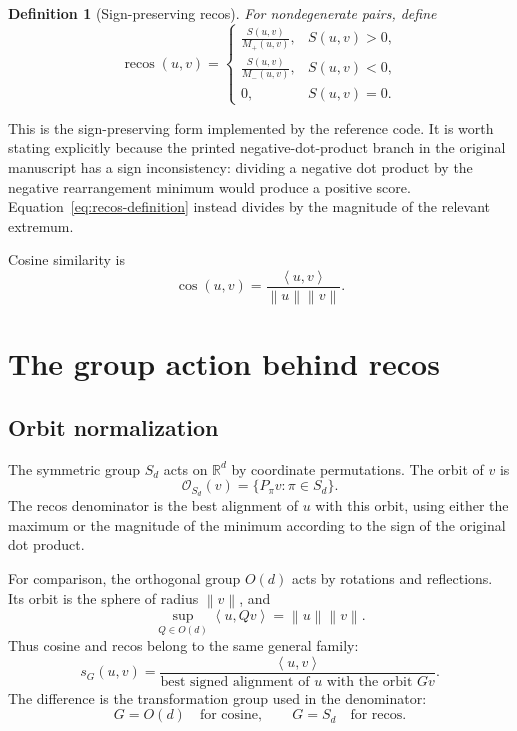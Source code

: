 \documentclass[11pt,a4paper]{article}
\newtheorem{definition}{Definition}
\newcommand{\R}{\mathbb{R}}
\newcommand{\Sd}{S_d}
\newcommand{\Od}{O(d)}
\newcommand{\ip}[2]{\left\langle #1,#2\right\rangle}
\newcommand{\norm}[1]{\left\lVert #1\right\rVert}
\newcommand{\recos}{\operatorname{recos}}
\newcommand{\cosim}{\operatorname{cos}}
\begin{document}
\begin{definition}[Sign-preserving recos]
For nondegenerate pairs, define
\begin{equation}
\recos(u,v)=
\begin{cases}
\displaystyle \frac{S(u,v)}{M_+(u,v)}, & S(u,v)>0,\\[1.0em]
\displaystyle \frac{S(u,v)}{M_-(u,v)}, & S(u,v)<0,\\[0.6em]
0, & S(u,v)=0.
\end{cases}
\label{eq:recos-definition}
\end{equation}
\end{definition}

This is the sign-preserving form implemented by the reference code. It is worth stating explicitly because the printed negative-dot-product branch in the original manuscript has a sign inconsistency: dividing a negative dot product by the negative rearrangement minimum would produce a positive score. Equation~\eqref{eq:recos-definition} instead divides by the magnitude of the relevant extremum.

Cosine similarity is
\begin{equation}
    \cosim(u,v)=\frac{\ip{u}{v}}{\norm{u}\norm{v}}.
\end{equation}

\section{The group action behind recos}

\subsection{Orbit normalization}

The symmetric group $\Sd$ acts on $\R^d$ by coordinate permutations. The orbit of $v$ is
\begin{equation}
    \mathcal{O}_{\Sd}(v)=\{P_\pi v:\pi\in\Sd\}.
\end{equation}
The recos denominator is the best alignment of $u$ with this orbit, using either the maximum or the magnitude of the minimum according to the sign of the original dot product.

For comparison, the orthogonal group $\Od$ acts by rotations and reflections. Its orbit is the sphere of radius $\norm{v}$, and
\begin{equation}
    \sup_{Q\in\Od}\ip{u}{Qv}=\norm{u}\norm{v}.
\end{equation}
Thus cosine and recos belong to the same general family:
\begin{equation}
    s_G(u,v)
    =
    \frac{\ip{u}{v}}
    {\text{best signed alignment of $u$ with the orbit $Gv$}}.
\end{equation}
The difference is the transformation group used in the denominator:
\begin{equation}
    G=\Od \quad\text{for cosine},
    \qquad
    G=\Sd \quad\text{for recos}.
\end{equation}
\end{document}
